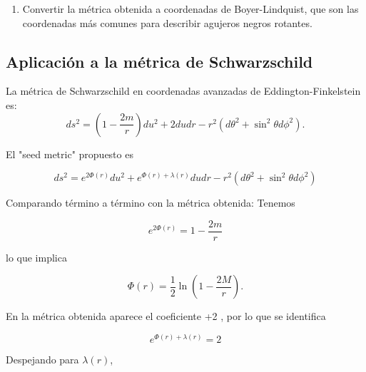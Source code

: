 \begin{enumerate}[1.]
    \item \begin{task}
        Convertir la métrica obtenida a coordenadas de Boyer-Lindquist, que son las coordenadas más comunes para describir agujeros negros rotantes. 
    \end{task}
\end{enumerate}

\subsection{Aplicación a la métrica de Schwarzschild}
La métrica de Schwarzschild en coordenadas avanzadas de Eddington-Finkelstein es:
\begin{equation}
    ds^2=\left(1-\frac{2 m}{r}\right) d u^2+2 d u d r-r^2\left(d \theta^2+\sin ^2 \theta d \phi^2\right) .
\end{equation}

El "seed metric" propuesto es

\begin{equation}
    d s^2=e^{2 \Phi(r)} d u^2+e^{\Phi(r)+\lambda(r)} d u d r-r^2\left(d \theta^2+\sin ^2 \theta d \phi^2\right)
\end{equation}

Comparando término a término con la métrica obtenida:
Tenemos

\begin{equation}
    e^{2 \Phi(r)}=1-\frac{2 m}{r}
\end{equation}

lo que implica

\begin{equation}
    \Phi(r)=\frac{1}{2} \ln \left(1-\frac{2 M}{r}\right) .
\end{equation}

En la métrica obtenida aparece el coeficiente +2 , por lo que se identifica

\begin{equation}
    e^{\Phi(r)+\lambda(r)}=2
\end{equation}

Despejando para $\lambda(r)$,

